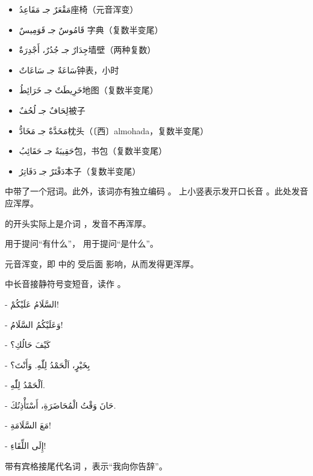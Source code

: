 \begin{itemize}
    \item \ac{مَقْعَرٌ جـ مَقَاعِدُ}{座椅（元音浑变）}
    \item \ac{قَامُوسٌ جـ قَوَمِيسٌ }{字典（复数半变尾）}
    \item \ac{جِدَارٌ جـ جُدُرٌ، أَجْدِرَةٌ}{墙壁（两种复数）}
    \item \ac{سَاعَةٌ جـ سَاعَاتٌ}{钟表，小时}
    \item \ac{خَرِيطَتٌ جـ خَرَائِطُ}{地图（复数半变尾）}
    \item \ac{لِحَافٌ جـ لُحُفٌ}{被子}
    \item \ac{مَخَدَّةٌ جـ مَخَادُّ}{枕头（〔西〕almohada，复数半变尾）}
    \item \ac{حَقِيبَةٌ جـ حَقَائِبُ}{包，书包（复数半变尾）}
    \item \ac{دَفْتَرٌ جـ دَفَاتِرُ}{本子（复数半变尾）} 
\end{itemize}

\begin{attention}
     中带了一个冠词。此外，该词亦有独立编码  。  上小竖表示发开口长音  。此处发音应浑厚。 
    
     的开头实际上是介词  ，发音不再浑厚。

     用于提问``有什么''， 用于提问``是什么''。 

    元音浑变，即  中的  受后面  影响，从而发得更浑厚。

     中长音接静符号变短音，读作  。
\end{attention}

\begin{Arabic}
    - السَّلَامُ عَلَيْكُمْ!

    - وَعَلَيْكُمُ السَّلَامُ!

    - كَيْفَ حَالُكِ؟

    - بِخَيْرٍ، اَلْحَمْدُ لِلّٰهِ. وَأَنْتَ؟

    - اَلْحَمْدُ لِلّٰهِ.

    - حَانَ وَقْتُ الْمُحَاضَرَةِ، أَسْتَأْذِنُكَ.

    - مَعَ السَّلَامَةِ!

    - إِلَى اللِّقَاءِ!
\end{Arabic}

\begin{attention}
     带有宾格接尾代名词  ，表示``我向你告辞''。
\end{attention}

